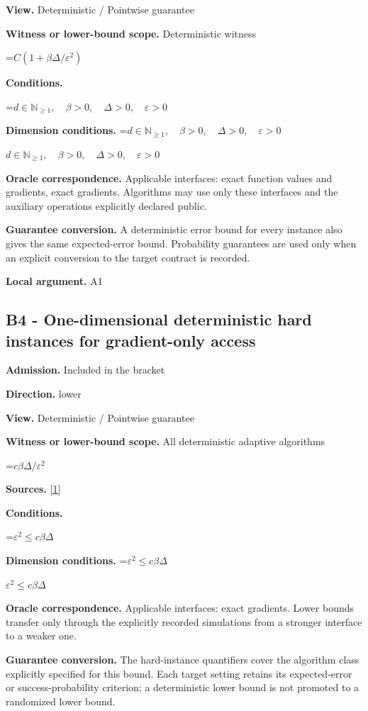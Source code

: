 \documentclass[10pt,a4paper]{article}
\newcommand{\AtlasMath}[1]{\par\begingroup\centering\setbox0=\hbox{$\displaystyle #1$}\ifdim\wd0>1.4\linewidth\typeout{ATLAS WIDE FORMULA: \the\wd0}\fi\ifdim\wd0>\linewidth\resizebox{\linewidth}{!}{\box0}\else\box0\fi\par\endgroup}
\newcommand{\AtlasInlineMath}[1]{\begingroup\setbox0=\hbox{$#1$}\ifdim\wd0>.4\linewidth\endgroup\AtlasMath{#1}\else\endgroup$#1$\fi}
\begin{document}
\textbf{View.} Deterministic / Pointwise guarantee

\textbf{Witness or lower-bound scope.} Deterministic witness

\AtlasMath{C(1+\beta\Delta/\varepsilon^2)}
\textbf{Conditions.} 


\AtlasMath{d\in\mathbb{N}_{\ge1},\quad \beta>0,\quad \Delta>0,\quad \varepsilon>0}




\textbf{Dimension conditions.} \AtlasInlineMath{d\in\mathbb{N}_{\ge1},\quad \beta>0,\quad \Delta>0,\quad \varepsilon>0}

\textbf{Oracle correspondence.} Applicable interfaces: exact function values and gradients, exact gradients. Algorithms may use only these interfaces and the auxiliary operations explicitly declared public.

\textbf{Guarantee conversion.} A deterministic error bound for every instance also gives the same expected-error bound. Probability guarantees are used only when an explicit conversion to the target contract is recorded.

\textbf{Local argument.} A1

\subsection{B4 - One-dimensional deterministic hard instances for gradient-only access}
\textbf{Admission.} Included in the bracket

\textbf{Direction.} lower

\textbf{View.} Deterministic / Pointwise guarantee

\textbf{Witness or lower-bound scope.} All deterministic adaptive algorithms

\AtlasMath{c\beta\Delta/\varepsilon^2}
\textbf{Sources.} \href{https://arxiv.org/pdf/2209.07513}{[1]}

\textbf{Conditions.} 


\AtlasMath{\varepsilon^2\le c\beta\Delta}




\textbf{Dimension conditions.} \AtlasInlineMath{\varepsilon^2\le c\beta\Delta}

\textbf{Oracle correspondence.} Applicable interfaces: exact gradients. Lower bounds transfer only through the explicitly recorded simulations from a stronger interface to a weaker one.

\textbf{Guarantee conversion.} The hard-instance quantifiers cover the algorithm class explicitly specified for this bound. Each target setting retains its expected-error or success-probability criterion; a deterministic lower bound is not promoted to a randomized lower bound.
\end{document}
